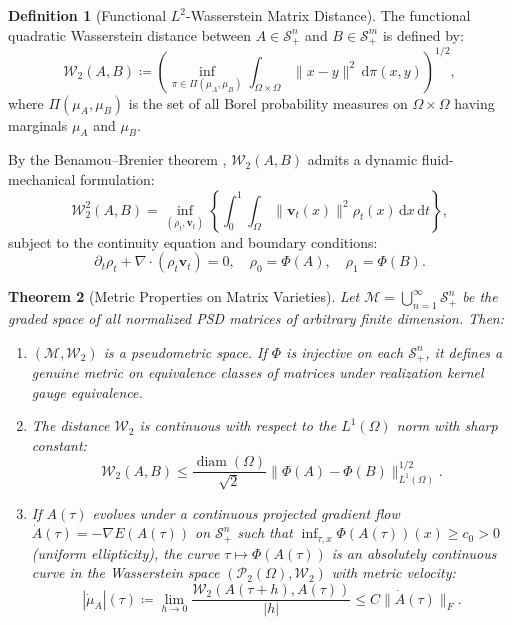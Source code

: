 \documentclass[11pt,a4paper,reqno]{amsart}
\newtheorem{theorem}{Theorem}[section]
\theoremstyle{definition}
\newtheorem{definition}[theorem]{Definition}
\numberwithin{equation}{section}
\newcommand{\dif}{\,\mathrm{d}}
\newcommand{\diam}{\operatorname{diam}}
\begin{document}
\begin{definition}[Functional $L^2$-Wasserstein Matrix Distance]
The functional quadratic Wasserstein distance between $A \in \mathcal{S}_+^n$ and $B \in \mathcal{S}_+^m$ is defined by:
\begin{equation}
    \mathcal{W}_2(A, B) \coloneqq \left( \inf_{\pi \in \Pi(\mu_A, \mu_B)} \int_{\Omega \times \Omega} \|x - y\|^2 \dif \pi(x, y) \right)^{1/2},
    \label{eq:wasserstein_matrix}
\end{equation}
where $\Pi(\mu_A, \mu_B)$ is the set of all Borel probability measures on $\Omega \times \Omega$ having marginals $\mu_A$ and $\mu_B$.
\end{definition}

By the Benamou--Brenier theorem \cite{benamou2000computational}, $\mathcal{W}_2(A, B)$ admits a dynamic fluid-mechanical formulation:
\begin{equation}
    \mathcal{W}_2^2(A, B) = \inf_{(\rho_t, \mathbf{v}_t)} \left\{ \int_0^1 \int_\Omega \|\mathbf{v}_t(x)\|^2 \rho_t(x) \dif x \dif t \right\},
\end{equation}
subject to the continuity equation and boundary conditions:
\begin{equation}
    \partial_t \rho_t + \nabla \cdot (\rho_t \mathbf{v}_t) = 0, \quad \rho_0 = \Phi(A), \quad \rho_1 = \Phi(B).
\end{equation}

\begin{theorem}[Metric Properties on Matrix Varieties]
\label{thm:wasserstein_properties}
Let $\mathcal{M} = \bigcup_{n=1}^\infty \mathcal{S}_+^n$ be the graded space of all normalized PSD matrices of arbitrary finite dimension. Then:
\begin{enumerate}[label=(\alph*)]
    \item $(\mathcal{M}, \mathcal{W}_2)$ is a pseudometric space. If $\Phi$ is injective on each $\mathcal{S}_+^n$, it defines a genuine metric on equivalence classes of matrices under realization kernel gauge equivalence.
    \item The distance $\mathcal{W}_2$ is continuous with respect to the $L^1(\Omega)$ norm with sharp constant:
    \begin{equation}
        \mathcal{W}_2(A, B) \le \frac{\diam(\Omega)}{\sqrt{2}} \|\Phi(A) - \Phi(B)\|_{L^1(\Omega)}^{1/2}.
    \end{equation}
    \item If $A(\tau)$ evolves under a continuous projected gradient flow $\dot{A}(\tau) = -\nabla E(A(\tau))$ on $\mathcal{S}_+^n$ such that $\inf_{\tau, x} \Phi(A(\tau))(x) \ge c_0 > 0$ (uniform ellipticity), the curve $\tau \mapsto \Phi(A(\tau))$ is an absolutely continuous curve in the Wasserstein space $(\mathcal{P}_2(\Omega), \mathcal{W}_2)$ with metric velocity:
    \begin{equation}
        |\dot{\mu}_A|(\tau) \coloneqq \lim_{h \to 0} \frac{\mathcal{W}_2(A(\tau+h), A(\tau))}{|h|} \le C \|\dot{A}(\tau)\|_F.
    \end{equation}
\end{enumerate}
\end{theorem}
\end{document}
